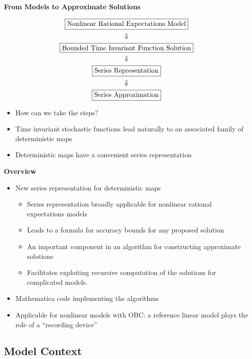 \documentclass[12pt]{article}
\begin{document}
{\bf From Models to Approximate Solutions }

  \begin{gather}
    \fbox{Nonlinear Rational Expectations Model}\\ \Downarrow\\
\fbox{Bounded Time Invariant Function Solution}\\\Downarrow\\
\fbox{Series Representation}\\\Downarrow\\
\fbox{Series Approximation}
  \end{gather}
  \begin{itemize}
  \item  How can we take the  steps?
  \item Time invariant stochastic functions 
lead naturally to an associated family of deterministic maps
\item Deterministic maps have a convenient series representation
  \end{itemize}


 {\bf Overview}

  \begin{itemize}
\item New series representation for deterministic maps
  \begin{itemize}
\item Series representation broadly applicable for nonlinear rational expectations models 
\item Leads to a formula for accuracy bounds for any proposed solution
\item An important component in an algorithm for constructing approximate solutions 
\item Facilitates exploiting recursive computation of the solutions for complicated models.
  \end{itemize}
\item Mathematica code implementing the algorithms
\item Applicable for nonlinear models with OBC: a reference linear model plays the role of a ``recording device''
  \end{itemize}
\subsection{Model Context}
\label{sec:model-context}
\end{document}
